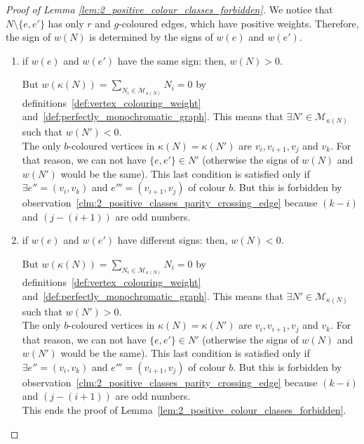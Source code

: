 \begin{proof}[Proof of Lemma \ref{lem:2_positive_colour_classes_forbidden}]
    We notice that $N \setminus \{e, e'\}$ has only $r$ and $g$-coloured edges, which have positive weights.
    Therefore, the sign of $w(N)$ is determined by the signs of $w(e)$ and $w(e')$.

    \begin{enumerate}
        \item if $w(e)$ and $w(e')$ have the same sign: then, $w(N) > 0$.

            But $w(\kappa(N)) = \sum\limits_{N_i \in \mathcal{M}_{\kappa(N)}} N_i = 0$ by definitions~\ref{def:vertex_colouring_weight} and~\ref{def:perfectly_monochromatic_graph}.
            This means that $\exists N' \in \mathcal{M}_{\kappa(N)}$ such that $w(N') < 0$.\\

            The only $b$-coloured vertices in $\kappa(N) = \kappa(N')$ are $v_i, v_{i+1}, v_j$ and $v_k$.
            For that reason, we can not have $\{e, e'\} \in N'$ (otherwise the signs of $w(N)$ and $w(N')$ would be the same).
            This last condition is satisfied only if $\exists e'' = (v_i, v_k)$ and $e''' = (v_{i+1}, v_j)$ of colour $b$.
            But this is forbidden by observation~\ref{clm:2_positive_classes_parity_crossing_edge} because $(k - i)$ and $\left(j - (i + 1)\right)$ are odd numbers.

        \item if $w(e)$ and $w(e')$ have different signs: then, $w(N) < 0$.

            But $w(\kappa(N)) = \sum\limits_{N_i \in \mathcal{M}_{\kappa(N)}} N_i = 0$ by definitions~\ref{def:vertex_colouring_weight} and~\ref{def:perfectly_monochromatic_graph}.
            This means that $\exists N' \in \mathcal{M}_{\kappa(N)}$ such that $w(N') > 0$.\\

            The only $b$-coloured vertices in $\kappa(N) = \kappa(N')$ are $v_i, v_{i+1}, v_j$ and $v_k$.
            For that reason, we can not have $\{e, e'\} \in N'$ (otherwise the signs of $w(N)$ and $w(N')$ would be the same).
            This last condition is satisfied only if $\exists e'' = (v_i, v_k)$ and $e''' = (v_{i+1}, v_j)$ of colour $b$.
            But this is forbidden by observation~\ref{clm:2_positive_classes_parity_crossing_edge} because $(k - i)$ and $\left(j - (i + 1)\right)$ are odd numbers.\\

            This ends the proof of Lemma~\ref{lem:2_positive_colour_classes_forbidden}.
    \end{enumerate}
\end{proof}


